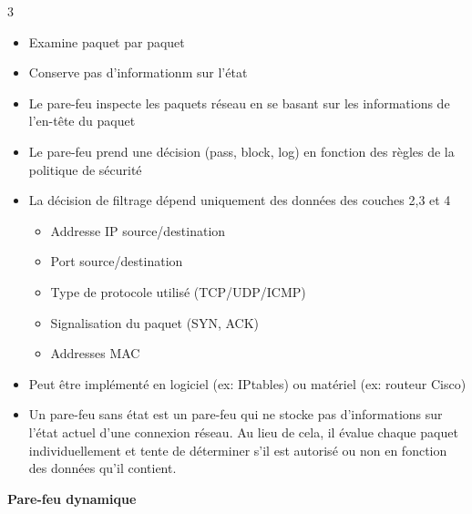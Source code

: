 \documentclass[9pt, a4paper, twoside]{article}
\begin{document}
\begin{multicols}{3}
\begin{itemize}[label=$\bullet$]
    \item \scriptsize Examine paquet par paquet
    \item \scriptsize Conserve pas d'informationm sur l'état
    \item \scriptsize Le pare-feu inspecte les paquets réseau en se basant sur les informations de l'en-tête du paquet
    \item \scriptsize Le pare-feu prend une décision (pass, block, log) en fonction des règles de la politique de sécurité
    \item \scriptsize La décision de filtrage dépend uniquement des données des couches 2,3 et 4
    \begin{itemize}[label=$\circ$]
        \item \scriptsize Addresse IP source/destination
        \item \scriptsize Port source/destination
        \item \scriptsize Type de protocole utilisé (TCP/UDP/ICMP)
        \item \scriptsize Signalisation du paquet (SYN, ACK)
        \item \scriptsize Addresses MAC
    \end{itemize}
    \item \scriptsize Peut être implémenté en logiciel (ex: IPtables) ou matériel (ex: routeur Cisco)
    \item \scriptsize Un pare-feu sans état est un pare-feu qui ne stocke pas d'informations sur l'état actuel d'une connexion réseau. Au lieu de cela, il évalue chaque paquet individuellement et tente de déterminer s'il est autorisé ou non en fonction des données qu'il contient.
\end{itemize}

\begin{flushleft}
    \scriptsize \textbf{Pare-feu dynamique}
\end{flushleft}


\end{multicols}
\end{document}

